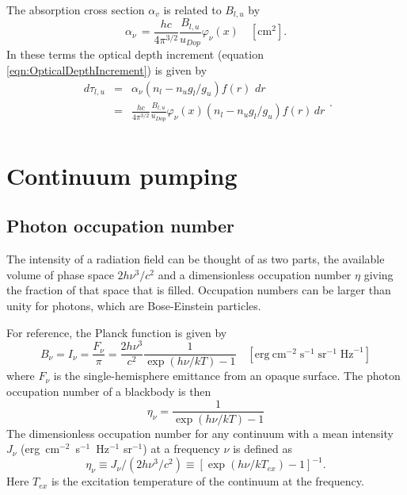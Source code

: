 The absorption cross section $\alpha _v$ is related to $B_{l,u}$ by
\begin{equation}
{\alpha _\nu }\, = \frac{{hc}}{{4{\pi
^{3/2}}}}\frac{{{B_{l,u}}}}{{{u_{Dop}}}}{\varphi _\nu }\left( x \right)
\quad [\mathrm{cm}^2].
\end{equation}
In these terms the optical depth increment
(equation \ref{eqn:OpticalDepthIncrement}) is given by
\begin{equation}
\begin{array}{ccl}
 d{\tau _{l,u}}& =& {\alpha _\nu }\left( {{n_l} - {n_u}{g_l}/{g_u}}
\right)f\left( r \right)\,\,dr \\
& =& \frac{{hc}}{{4{\pi ^{3/2}}}}\frac{{{B_{l,u}}}}{{{u_{Dop}}}}{\varphi
_\nu }\left( x \right)\left( {{n_l} - {n_u}{g_l}/{g_u}} \right)f\left( r
\right)\,dr \\
 \end{array}
 .
\end{equation}

\section{Continuum pumping}

\subsection{Photon occupation number}

The intensity of a radiation field can be thought of as two parts, the
available volume of phase space $2h{\nu ^3}/{c^2}$
and a dimensionless occupation number $\eta$ giving the fraction
of that space that is filled.
Occupation numbers can be larger than unity for
photons, which are Bose-Einstein particles.

For reference, the Planck function is given by
\begin{equation}
{B_\nu } = {I_\nu } = \frac{{{F_\nu }}}{\pi } = \frac{{2h{\nu
^3}}}{{{c^2}}}\frac{1}{{\exp \left( {h\nu /kT} \right) - 1}}
\quad  [\mathrm{erg~cm}^{-2}\;\mathrm{s}^{-1}\; \mathrm{sr}^{-1}\; \mathrm{Hz}^{-1}]%
\end{equation}
where $F_\nu$ is the single-hemisphere emittance from an opaque surface.
The photon occupation number of a blackbody is then
\begin{equation}
\label{eqn:PhotonOccupationNumber}
{\eta _\nu } = \frac{1}{{\exp \left( {h\nu /kT} \right) - 1}}
\end{equation}
The dimensionless occupation number for any continuum with a mean intensity
$J_\nu$ (erg~cm$^{-2}$~s$^{-1}$~Hz$^{-1}$ sr$^{-1}$) at a frequency $\nu$ is defined as
\begin{equation}
{\eta _\nu } \equiv {J_\nu }/\left( {2h{\nu ^3}/{c^2}} \right) \equiv
{\left[ {\exp \left( {h\nu /k{T_{ex}}} \right) - 1} \right]^{ - 1}}
.
\end{equation}
Here $T_{ex}$ is the excitation temperature of the continuum at the frequency.

